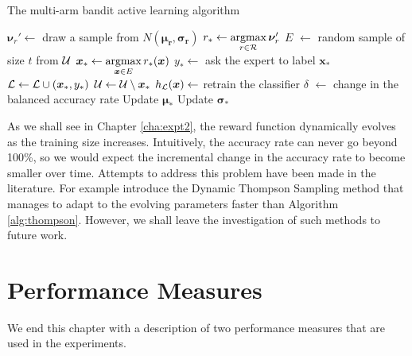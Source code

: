 \begin{algorithm}[h]
	\caption{The multi-arm bandit active learning algorithm}
	\label{alg:bandit}
	\begin{algorithmic}[1]
			\State $\bm{\nu}_r' \leftarrow$ draw a sample from $N(\bm{\mu_r}, \bm{\sigma_r})$
		\Endforeach
		\State $r_* \leftarrow \argmax_{r \in \R} \bm{\nu}_r'$
		\State $E$ $\leftarrow$ random sample of size $t$ from $\mathcal{U}$
		\State $\bm{x}_* \leftarrow \argmax_{\bm{x} \in E} r_*(\bm{x})$
		\State $y_* \leftarrow$ ask the expert to label $\bm{x}_*$
		\State $\mathcal{L} \leftarrow \mathcal{L}  \cup (\bm{x}_*, y_*)$
		\State $\mathcal{U} \leftarrow \mathcal{U} \setminus \bm{x}_*$
		\State $h_{\mathcal{L}}(\bm{x}) \leftarrow$ retrain the classifier
		\State $\delta$ $\leftarrow$ change in the balanced accuracy rate 
		\State Update $\bm{\mu}_{*}$
		\State Update $\bm{\sigma}_{*}$
		\EndWhile
		\EndProcedure
	\end{algorithmic}
\end{algorithm}

As we shall see in Chapter \ref{cha:expt2}, the reward function dynamically evolves
as the training size increases. Intuitively, the accuracy rate can never go beyond 100\%, so
we would expect the incremental change in the accuracy rate to become smaller over time.
Attempts to address this problem have been made in the literature. For example 
introduce the Dynamic Thompson Sampling method that manages to adapt to the evolving
parameters faster than Algorithm \ref{alg:thompson}. However, we shall leave the investigation
of such methods to future work.


\section{Performance Measures}
\label{sec:measures}

We end this chapter with a description of two performance measures that are used in the experiments.

